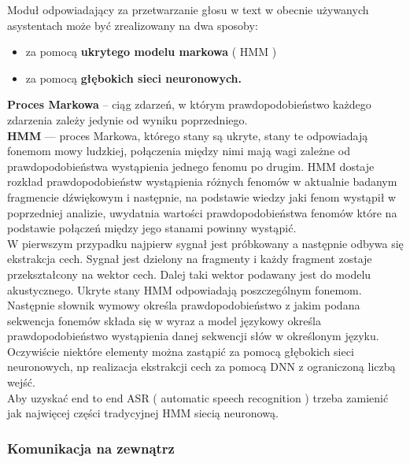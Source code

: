 Moduł odpowiadający za przetwarzanie głosu w text w obecnie używanych asystentach może być zrealizowany na dwa sposoby: 

\begin{itemize}
	\item za pomocą \textbf{ukrytego modelu markowa} ( HMM )
	\item za pomocą \textbf{głębokich sieci neuronowych.} \\
\end{itemize} 

\textbf{Proces Markowa} – ciąg zdarzeń, w którym prawdopodobieństwo każdego zdarzenia zależy jedynie od wyniku poprzedniego. \\

\textbf{HMM} — proces Markowa, którego stany są ukryte, stany te odpowiadają fonemom mowy ludzkiej, połączenia między nimi mają wagi zależne od prawdopodobieństwa wystąpienia jednego fenomu po drugim. HMM dostaje rozkład prawdopodobieństw wystąpienia różnych fenomów w aktualnie badanym fragmencie dźwiękowym i następnie, na podstawie wiedzy jaki fenom wystąpił w poprzedniej analizie, uwydatnia wartości prawdopodobieństwa fenomów które na podstawie połączeń między jego stanami powinny wystąpić. \\

W pierwszym przypadku najpierw sygnał jest próbkowany a następnie odbywa się ekstrakcja cech. Sygnał jest dzielony na fragmenty i każdy fragment zostaje przekształcony na wektor cech. Dalej taki wektor podawany jest do modelu akustycznego. Ukryte stany HMM odpowiadają poszczególnym fonemom. Następnie słownik wymowy określa prawdopodobieństwo z jakim podana sekwencja fonemów składa się w wyraz a model językowy określa prawdopodobieństwo wystąpienia danej sekwencji słów w określonym języku. \\

Oczywiście niektóre elementy można zastąpić za pomocą głębokich sieci neuronowych, np realizacja ekstrakcji cech za pomocą DNN z ograniczoną liczbą wejść. \\

Aby uzyskać end to end ASR ( automatic speech recognition ) trzeba zamienić jak najwięcej części tradycyjnej HMM siecią neuronową. \\

\subsubsection{Komunikacja na zewnątrz}

